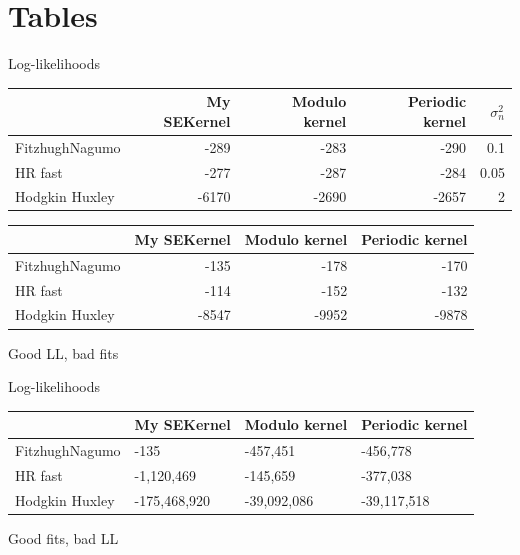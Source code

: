 \documentclass[presentation]{beamer}
\begin{document}
\section{Tables}
\label{sec:orgbe9f612}
\begin{frame}[label={sec:org21020c1}]{Log-likelihoods}
\begin{center}
\begin{tabular}{lrrrr}
\hline
 & My SEKernel & Modulo kernel & Periodic kernel & \(\sigma_n^2\)\\
\hline
FitzhughNagumo & -289 & -283 & -290 & 0.1\\
HR fast & -277 & -287 & -284 & 0.05\\
Hodgkin Huxley & -6170 & -2690 & -2657 & 2\\
\hline
\end{tabular}
\end{center}

\vfill

\begin{center}
\begin{tabular}{lrrr}
\hline
 & My SEKernel & Modulo kernel & Periodic kernel\\
\hline
FitzhughNagumo & -135 & -178 & -170\\
HR fast & -114 & -152 & -132\\
Hodgkin Huxley & -8547 & -9952 & -9878\\
\hline
\end{tabular}
\end{center}

Good LL, bad fits
\end{frame}

\begin{frame}[label={sec:org4f8845e}]{Log-likelihoods}
\begin{center}
\begin{tabular}{llll}
\hline
 & My SEKernel & Modulo kernel & Periodic kernel\\
\hline
FitzhughNagumo & -135 & -457,451 & -456,778\\
HR fast & -1,120,469 & -145,659 & -377,038\\
Hodgkin Huxley & -175,468,920 & -39,092,086 & -39,117,518\\
\hline
\end{tabular}
\end{center}

\vfill

Good fits, bad LL
\end{frame}
\end{document}
